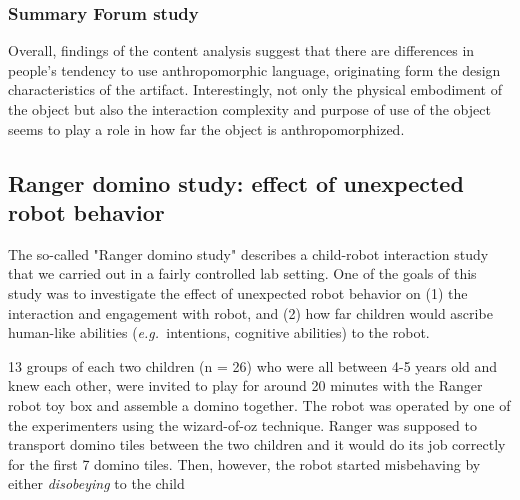 \documentclass{frontiersSCNS} %
\newcommand{\eg}{{\textit{e.g.~}}}
\begin{document}
\subsubsection{Summary Forum study\\}

Overall, findings of the content analysis suggest that there are differences in
people's tendency to use anthropomorphic language, originating form the design
characteristics of the artifact. Interestingly, not only the physical embodiment
of the object but also the interaction complexity and purpose of use of the
object seems to play a role in how far the object is anthropomorphized.

\subsection{Ranger domino study: effect of unexpected robot behavior}

The so-called "Ranger domino study" describes a child-robot interaction study
that we carried out in a fairly controlled lab setting. One of the goals of this
study was to investigate the effect of unexpected robot behavior on (1) the
interaction and engagement with robot, and (2) how far children would ascribe
human-like abilities (\eg intentions, cognitive abilities) to the robot.

13 groups of each two children (n = 26) who were all between 4-5 years old and
knew each other, were invited to play for around 20 minutes with the Ranger
robot toy box \citep{fink2014which} and assemble a domino together. The robot
was operated by one of the experimenters using the wizard-of-oz technique.
Ranger was supposed to transport domino tiles between the two children and it
would do its job correctly for the first 7 domino tiles. Then, however, the
robot started misbehaving by either \textit{disobeying} to the child
\end{document}
